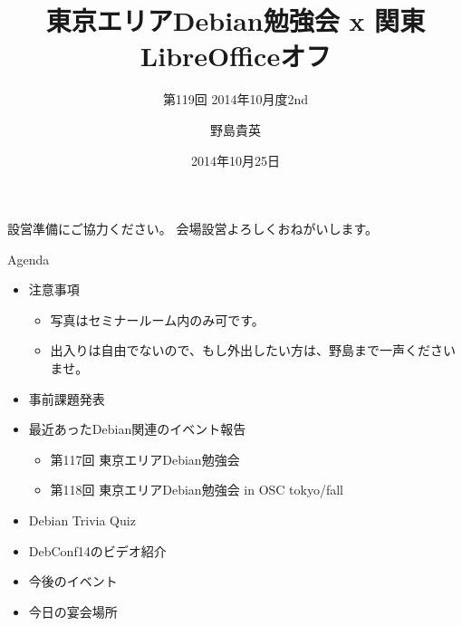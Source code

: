 \title{東京エリアDebian勉強会 x 関東LibreOfficeオフ}
\subtitle{第119回 2014年10月度2nd}
\author{野島貴英}
\date{2014年10月25日}



\begin{frame}
\titlepage{}
\end{frame}

\begin{frame}{設営準備にご協力ください。}
会場設営よろしくおねがいします。
\end{frame}

\begin{frame}{Agenda}
 \begin{minipage}[t]{0.45\hsize}
  \begin{itemize}
   \item 注意事項
	 \begin{itemize}
	  \item 写真はセミナールーム内のみ可です。
          \item 出入りは自由でないので、もし外出したい方は、野島まで一声くださいませ。
	 \end{itemize}
   \item 事前課題発表
  \end{itemize}
 \end{minipage} 
 \begin{minipage}[t]{0.45\hsize}
  \begin{itemize}
   \item 最近あったDebian関連のイベント報告
	 \begin{itemize}
	  \item 第117回 東京エリアDebian勉強会
	  \item 第118回 東京エリアDebian勉強会 in OSC tokyo/fall
	 \end{itemize}
   \item Debian Trivia Quiz
   \item DebConf14のビデオ紹介
   \item 今後のイベント
   \item 今日の宴会場所
  \end{itemize}
 \end{minipage}
\end{frame}

